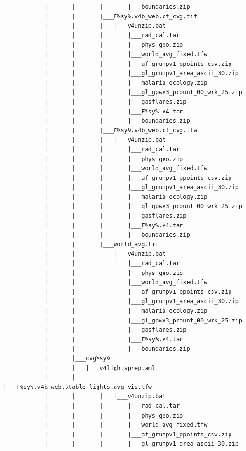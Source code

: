 \documentclass[]{book}
\begin{document}
\begin{verbatim}
            |       |       |       |___boundaries.zip
            |       |       |___F%sy%.v4b_web.cf_cvg.tif
            |       |       |   |___v4unzip.bat
            |       |       |       |___rad_cal.tar
            |       |       |       |___phys_geo.zip
            |       |       |       |___world_avg_fixed.tfw
            |       |       |       |___af_grumpv1_ppoints_csv.zip
            |       |       |       |___gl_grumpv1_area_ascii_30.zip
            |       |       |       |___malaria_ecology.zip
            |       |       |       |___gl_gpwv3_pcount_00_wrk_25.zip
            |       |       |       |___gasflares.zip
            |       |       |       |___F%sy%.v4.tar
            |       |       |       |___boundaries.zip
            |       |       |___F%sy%.v4b_web.cf_cvg.tfw
            |       |       |   |___v4unzip.bat
            |       |       |       |___rad_cal.tar
            |       |       |       |___phys_geo.zip
            |       |       |       |___world_avg_fixed.tfw
            |       |       |       |___af_grumpv1_ppoints_csv.zip
            |       |       |       |___gl_grumpv1_area_ascii_30.zip
            |       |       |       |___malaria_ecology.zip
            |       |       |       |___gl_gpwv3_pcount_00_wrk_25.zip
            |       |       |       |___gasflares.zip
            |       |       |       |___F%sy%.v4.tar
            |       |       |       |___boundaries.zip
            |       |       |___world_avg.tif
            |       |           |___v4unzip.bat
            |       |               |___rad_cal.tar
            |       |               |___phys_geo.zip
            |       |               |___world_avg_fixed.tfw
            |       |               |___af_grumpv1_ppoints_csv.zip
            |       |               |___gl_grumpv1_area_ascii_30.zip
            |       |               |___malaria_ecology.zip
            |       |               |___gl_gpwv3_pcount_00_wrk_25.zip
            |       |               |___gasflares.zip
            |       |               |___F%sy%.v4.tar
            |       |               |___boundaries.zip
            |       |___cvg%sy%
            |       |   |___v4lightsprep.aml
            |       |       |___F%sy%.v4b_web.stable_lights.avg_vis.tfw
            |       |       |   |___v4unzip.bat
            |       |       |       |___rad_cal.tar
            |       |       |       |___phys_geo.zip
            |       |       |       |___world_avg_fixed.tfw
            |       |       |       |___af_grumpv1_ppoints_csv.zip
            |       |       |       |___gl_grumpv1_area_ascii_30.zip

\end{verbatim}
\end{document}
